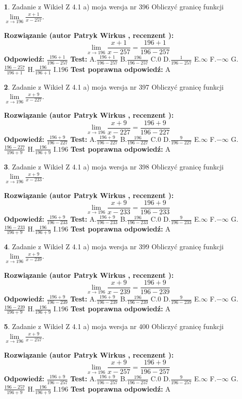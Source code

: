 \documentclass[12pt, a4paper]{article}
\theoremstyle{definition} %
\newtheorem{zad}{}
\newcommand{\zadStart}[1]{\begin{zad}#1\newline}
\newcommand{\zadStop}{\end{zad}}
\newcommand{\rozwStart}[2]{\noindent \textbf{Rozwiązanie (autor #1 , recenzent #2): }\newline}
\newcommand{\rozwStop}{\newline}
\newcommand{\odpStart}{\noindent \textbf{Odpowiedź:}\newline}
\newcommand{\odpStop}{\newline}
\newcommand{\testStart}{\noindent \textbf{Test:}\newline}
\newcommand{\testStop}{\newline}
\newcommand{\kluczStart}{\noindent \textbf{Test poprawna odpowiedź:}\newline}
\newcommand{\kluczStop}{\newline}
\begin{document}
\zadStart{Zadanie z Wikieł Z 4.1 a) moja wersja nr 396}
Obliczyć granicę funkcji $\lim\limits_{x\to196}\frac{x+1}{x-257}$.
\zadStop
\rozwStart{Patryk Wirkus}{}
$$\lim\limits_{x\to196}\frac{x+1}{x-257} = \frac{196+1}{196-257}$$
\rozwStop
\odpStart
$\frac{196+1}{196-257}$
\odpStop
\testStart
A.$\frac{196+1}{196-257}$
B.$\frac{196}{196-257}$
C.$0$
D.$\frac{1}{196-257}$
E.$\infty$
F.$-\infty$
G.$\frac{196-257}{196+1}$
H.$\frac{196}{196+1}$
I.$196$
\testStop
\kluczStart
A
\kluczStop



\zadStart{Zadanie z Wikieł Z 4.1 a) moja wersja nr 397}
Obliczyć granicę funkcji $\lim\limits_{x\to196}\frac{x+9}{x-227}$.
\zadStop
\rozwStart{Patryk Wirkus}{}
$$\lim\limits_{x\to196}\frac{x+9}{x-227} = \frac{196+9}{196-227}$$
\rozwStop
\odpStart
$\frac{196+9}{196-227}$
\odpStop
\testStart
A.$\frac{196+9}{196-227}$
B.$\frac{196}{196-227}$
C.$0$
D.$\frac{9}{196-227}$
E.$\infty$
F.$-\infty$
G.$\frac{196-227}{196+9}$
H.$\frac{196}{196+9}$
I.$196$
\testStop
\kluczStart
A
\kluczStop



\zadStart{Zadanie z Wikieł Z 4.1 a) moja wersja nr 398}
Obliczyć granicę funkcji $\lim\limits_{x\to196}\frac{x+9}{x-233}$.
\zadStop
\rozwStart{Patryk Wirkus}{}
$$\lim\limits_{x\to196}\frac{x+9}{x-233} = \frac{196+9}{196-233}$$
\rozwStop
\odpStart
$\frac{196+9}{196-233}$
\odpStop
\testStart
A.$\frac{196+9}{196-233}$
B.$\frac{196}{196-233}$
C.$0$
D.$\frac{9}{196-233}$
E.$\infty$
F.$-\infty$
G.$\frac{196-233}{196+9}$
H.$\frac{196}{196+9}$
I.$196$
\testStop
\kluczStart
A
\kluczStop



\zadStart{Zadanie z Wikieł Z 4.1 a) moja wersja nr 399}
Obliczyć granicę funkcji $\lim\limits_{x\to196}\frac{x+9}{x-239}$.
\zadStop
\rozwStart{Patryk Wirkus}{}
$$\lim\limits_{x\to196}\frac{x+9}{x-239} = \frac{196+9}{196-239}$$
\rozwStop
\odpStart
$\frac{196+9}{196-239}$
\odpStop
\testStart
A.$\frac{196+9}{196-239}$
B.$\frac{196}{196-239}$
C.$0$
D.$\frac{9}{196-239}$
E.$\infty$
F.$-\infty$
G.$\frac{196-239}{196+9}$
H.$\frac{196}{196+9}$
I.$196$
\testStop
\kluczStart
A
\kluczStop



\zadStart{Zadanie z Wikieł Z 4.1 a) moja wersja nr 400}
Obliczyć granicę funkcji $\lim\limits_{x\to196}\frac{x+9}{x-257}$.
\zadStop
\rozwStart{Patryk Wirkus}{}
$$\lim\limits_{x\to196}\frac{x+9}{x-257} = \frac{196+9}{196-257}$$
\rozwStop
\odpStart
$\frac{196+9}{196-257}$
\odpStop
\testStart
A.$\frac{196+9}{196-257}$
B.$\frac{196}{196-257}$
C.$0$
D.$\frac{9}{196-257}$
E.$\infty$
F.$-\infty$
G.$\frac{196-257}{196+9}$
H.$\frac{196}{196+9}$
I.$196$
\testStop
\kluczStart
A
\kluczStop
\end{document}
